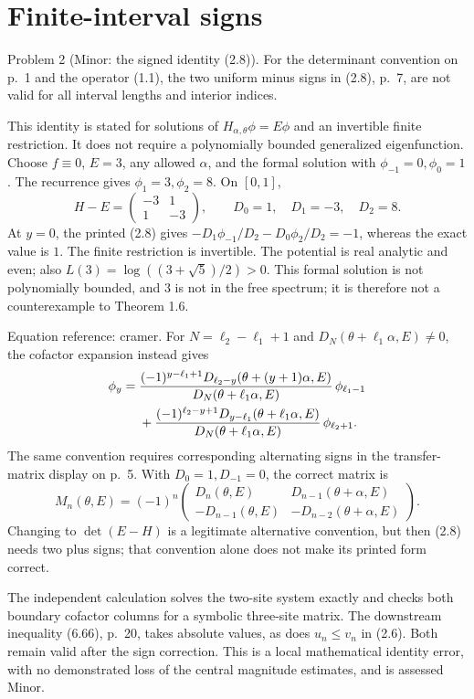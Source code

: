 \documentclass[10pt]{article}
\begin{document}
\section*{Finite-interval signs}
Problem 2 (Minor: the signed identity (2.8)).  For the determinant convention on p. 1 and the operator (1.1), the two uniform minus signs in (2.8), p. 7, are not valid for all interval lengths and interior indices.\par
This identity is stated for solutions of \(H_{\alpha,\theta}\phi=E\phi\) and an invertible finite restriction. It does not require a polynomially bounded generalized eigenfunction. Choose \(f\equiv0\), \(E=3\), any allowed \(\alpha\), and the formal solution with \(\phi_{-1}=0,\phi_0=1\). The recurrence gives \(\phi_1=3,\phi_2=8\). On \([0,1]\), \[H-E=\begin{pmatrix}-3&1\\1&-3\end{pmatrix},
 \qquad D_0=1,\quad D_1=-3,\quad D_2=8.\] At \(y=0\), the printed (2.8) gives \(-D_1\phi_{-1}/D_2-D_0\phi_2/D_2=-1\), whereas the exact value is \(1\). The finite restriction is invertible. The potential is real analytic and even; also \(L(3)=\log((3+\sqrt5)/2)>0\). This formal solution is not polynomially bounded, and \(3\) is not in the free spectrum; it is therefore not a counterexample to Theorem 1.6.\par
Equation reference: cramer. For \(N=\ell_2-\ell_1+1\) and \(D_N(\theta+\ell_1\alpha,E)\ne0\), the cofactor expansion instead gives \[\begin{aligned}

 \phi_y={}&
 \frac{(-1)^{y-\ell_1+1}D_{\ell_2-y}(\theta+(y+1)\alpha,E)}
 {D_N(\theta+\ell_1\alpha,E)}\,\phi_{\ell_1-1}\\
 &+\frac{(-1)^{\ell_2-y+1}D_{y-\ell_1}(\theta+\ell_1\alpha,E)}
 {D_N(\theta+\ell_1\alpha,E)}\,\phi_{\ell_2+1}.\notag\end{aligned}\] The same convention requires corresponding alternating signs in the transfer-matrix display on p. 5. With \(D_0=1,D_{-1}=0\), the correct matrix is \[M_n(\theta,E)=(-1)^n
 \begin{pmatrix}
 D_n(\theta,E)&D_{n-1}(\theta+\alpha,E)\\
 -D_{n-1}(\theta,E)&-D_{n-2}(\theta+\alpha,E)
 \end{pmatrix}.\] Changing to \(\det(E-H)\) is a legitimate alternative convention, but then (2.8) needs two plus signs; that convention alone does not make its printed form correct.\par
The independent calculation solves the two-site system exactly and checks both boundary cofactor columns for a symbolic three-site matrix. The downstream inequality (6.66), p. 20, takes absolute values, as does \(u_n\le v_n\) in (2.6). Both remain valid after the sign correction. This is a local mathematical identity error, with no demonstrated loss of the central magnitude estimates, and is assessed Minor.\par
\end{document}
